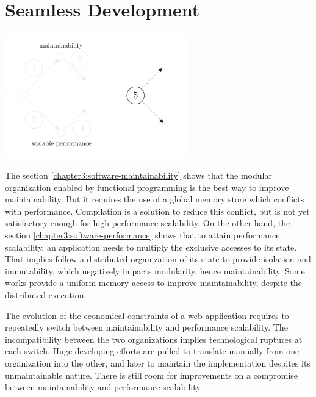 \section{Seamless Development} \label{chapter3:objectives}

\begin{center}
\includegraphics[width=0.6\textwidth]{../ressources/state-of-the-art-5.pdf}
\end{center}



The section \ref{chapter3:software-maintainability} shows that the modular organization enabled by functional programming is the best way to improve maintainability.
But it requires the use of a global memory store which conflicts with performance.
Compilation is a solution to reduce this conflict, but is not yet satisfactory enough for high performance scalability.
On the other hand, the section \ref{chapter3:software-performance} shows that to attain performance scalability, an application needs to multiply the exclusive accesses to its state.
That implies follow a distributed organization of its state to provide isolation and immutability, which negatively impacts modularity, hence maintainability.
Some works provide a uniform memory access to improve maintainability, despite the distributed execution.

The evolution of the economical constraints of a web application requires to repeatedly switch between maintainability and performance scalability.
The incompatibility between the two organizations implies technological ruptures at each switch.
Huge developing efforts are pulled to translate manually from one organization into the other, and later to maintain the implementation despites its unmaintainable nature.
There is still room for improvements on a compromise between maintainability and performance scalability.

